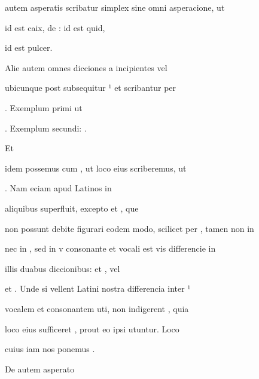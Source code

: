 autem asperatis scribatur simplex  sine omni asperacione, ut

   id est caix, de :  id est quid, 

\splitlines

id est pulcer.

\indentK Alie autem omnes dicciones a  incipientes vel

\fulllines

ubicunque post  subsequitur   ¹ et  scribantur per

. Exemplum primi ut     

\splitlines

. Exemplum secundi:    .

\indentK Et

\fulllines

idem possemus cum , ut loco eius  scriberemus, ut 

  . Nam eciam apud Latinos  in

 aliquibus superfluit, excepto  et , que 

non possunt debite figurari eodem modo, scilicet per , tamen non in 

nec in , sed in v consonante et vocali est vis differencie in

illis duabus diccionibus:  et , vel 

et . Unde si vellent Latini nostra differencia inter ¹

vocalem et  consonantem uti, non indigerent , quia

loco eius sufficeret , prout eo ipsi utuntur. Loco

\splitlines

cuius iam nos ponemus .

\indentK De  autem asperato

\fulllines

